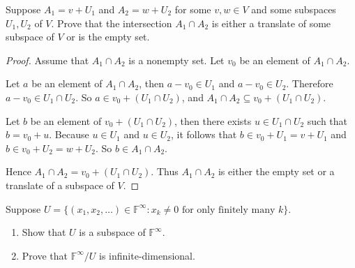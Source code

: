 \begin{exercise}
    Suppose $A_{1} = v + U_{1}$ and $A_{2} = w + U_{2}$ for some $v, w \in V$ and some subspaces $U_{1}, U_{2}$ of $V$. Prove that the intersection $A_{1} \cap A_{2}$ is either a translate of some subspace of $V$ or is the empty set.
\end{exercise}

\begin{proof}
    Assume that $A_{1}\cap A_{2}$ is a nonempty set. Let $v_{0}$ be an element of $A_{1}\cap A_{2}$.

    Let $a$ be an element of $A_{1}\cap A_{2}$, then $a - v_{0}\in U_{1}$ and $a - v_{0}\in U_{2}$. Therefore $a - v_{0}\in U_{1}\cap U_{2}$. So $a\in v_{0} + (U_{1}\cap U_{2})$, and $A_{1}\cap A_{2}\subseteq v_{0} + (U_{1}\cap U_{2})$.

    Let $b$ be an element of $v_{0} + (U_{1}\cap U_{2})$, then there exists $u\in U_{1}\cap U_{2}$ such that $b = v_{0} + u$. Because $u\in U_{1}$ and $u\in U_{2}$, it follows that $b\in v_{0} + U_{1} = v + U_{1}$ and $b\in v_{0} + U_{2} = w + U_{2}$. So $b\in A_{1}\cap A_{2}$.

    Hence $A_{1}\cap A_{2} = v_{0} + (U_{1}\cap U_{2})$. Thus $A_{1}\cap A_{2}$ is either the empty set or a translate of a subspace of $V$.
\end{proof}
\newpage

\begin{exercise}
    Suppose $U = \{(x_{1} , x_{2} , \ldots ) \in \mathbb{F}^{\infty} : x_{k} \ne 0 \text{ for only finitely many $k$} \}$.
    \begin{enumerate}[label={(\alph*)}]
        \item Show that $U$ is a subspace of $\mathbb{F}^{\infty}$.
        \item Prove that $\mathbb{F}^{\infty}/U$ is infinite-dimensional.
    \end{enumerate}
\end{exercise}

